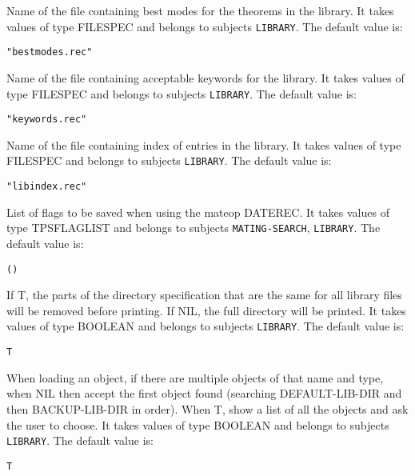 \begin{description}
\item[LIB-BESTMODE-FILE]  
Name of the file containing best modes for the theorems in the library.
It takes values of type FILESPEC and belongs to subjects \texttt{LIBRARY}.  The default value is: \begin{lstlisting}
"bestmodes.rec"
\end{lstlisting}

\item[LIB-KEYWORD-FILE]  
Name of the file containing acceptable keywords for the library.
It takes values of type FILESPEC and belongs to subjects \texttt{LIBRARY}.  The default value is: \begin{lstlisting}
"keywords.rec"
\end{lstlisting}

\item[LIB-MASTERINDEX-FILE]  
Name of the file containing index of entries in the library.
It takes values of type FILESPEC and belongs to subjects \texttt{LIBRARY}.  The default value is: \begin{lstlisting}
"libindex.rec"
\end{lstlisting}

\item[RECORDFLAGS]  
List of flags to be saved when using the mateop DATEREC.
It takes values of type TPSFLAGLIST and belongs to subjects \texttt{MATING-SEARCH}, \texttt{LIBRARY}.  The default value is: \begin{lstlisting}
()
\end{lstlisting}

\item[REMOVE-TRAILING-DIR]  
If T, the parts of the directory specification that are the same 
for all library files will be removed before printing. If NIL, the full
directory will be printed.
It takes values of type BOOLEAN and belongs to subjects \texttt{LIBRARY}.  The default value is: \begin{lstlisting}
T
\end{lstlisting}

\item[SHOW-ALL-LIBOBJECTS]  
When loading an object, if there are multiple objects of that name 
and type, when NIL then accept the first object found (searching 
DEFAULT-LIB-DIR and then BACKUP-LIB-DIR in order). When T, show a list
of all the objects and ask the user to choose.
It takes values of type BOOLEAN and belongs to subjects \texttt{LIBRARY}.  The default value is: \begin{lstlisting}
T
\end{lstlisting}

\item
\end{description}

